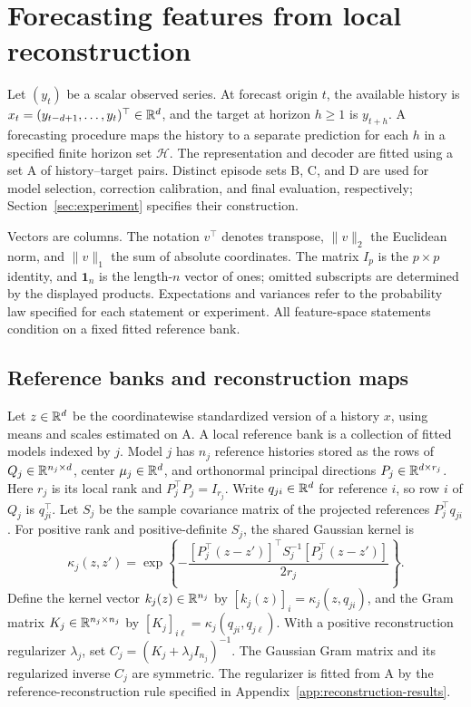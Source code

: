 \section{Forecasting features from local reconstruction}
\label{sec:reconstruction-method}
\label{sec:reconstruction-mechanism}

Let $(y_t)$ be a scalar observed series. At forecast origin $t$, the
available history is $x_t=(y_{t-d+1},\ldots,y_t)^\top\in\mathbb{R}^d$,
and the target at horizon $h\geq1$ is $y_{t+h}$. A forecasting procedure
maps the history to a separate prediction for each $h$ in a specified
finite horizon set $\mathcal H$. The representation and decoder are
fitted using a set A of history--target pairs. Distinct episode sets B,
C, and D are used for model selection, correction calibration, and
final evaluation, respectively; Section~\ref{sec:experiment} specifies
their construction.

Vectors are columns. The notation $v^\top$ denotes transpose,
$\|v\|_2$ the Euclidean norm, and $\|v\|_1$ the sum of absolute
coordinates. The matrix $I_p$ is the $p\times p$ identity, and
$\mathbf1_n$ is the length-$n$ vector of ones; omitted subscripts are
determined by the displayed products. Expectations and variances refer
to the probability law specified for each statement or experiment.
All feature-space statements condition on a fixed fitted reference bank.

\subsection{Reference banks and reconstruction maps}


Let $z\in\mathbb{R}^d$ be the coordinatewise standardized version of a history
$x$, using means and scales estimated on A. A local reference bank is a collection of fitted models indexed by
$j$. Model $j$ has $n_j$ reference histories stored as the rows of
$Q_j\in\mathbb{R}^{n_j\times d}$, center $\mu_j\in\mathbb{R}^d$, and orthonormal
principal directions $P_j\in\mathbb{R}^{d\times r_j}$. Here $r_j$ is its local
rank and $P_j^\top P_j=I_{r_j}$. Write $q_{ji}\in\mathbb{R}^d$ for reference
$i$, so row $i$ of $Q_j$ is $q_{ji}^\top$. Let $S_j$ be the sample
covariance matrix of the projected references $P_j^\top q_{ji}$. For
positive rank and positive-definite $S_j$, the shared Gaussian kernel is
\[
 \kappa_j(z,z')=\exp\!\left\{
 -\frac{[P_j^\top(z-z')]^\top S_j^{-1}[P_j^\top(z-z')]}{2r_j}
 \right\}.
\]
Define the kernel vector $k_j(z)\in\mathbb{R}^{n_j}$ by
$[k_j(z)]_i=\kappa_j(z,q_{ji})$, and the Gram matrix
$K_j\in\mathbb{R}^{n_j\times n_j}$ by
$[K_j]_{i\ell}=\kappa_j(q_{ji},q_{j\ell})$.
With a positive reconstruction regularizer $\lambda_j$, set
$C_j=(K_j+\lambda_j I_{n_j})^{-1}$. The Gaussian Gram matrix and its
regularized inverse $C_j$ are symmetric. The regularizer is fitted from A
by the reference-reconstruction rule specified in
Appendix~\ref{app:reconstruction-results}.

